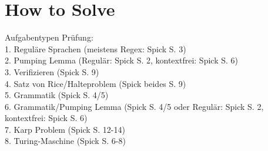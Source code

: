 \section{How to Solve}
Aufgabentypen Prüfung:\\
1. Reguläre Sprachen (meistens Regex: Spick S. 3)\\
2. Pumping Lemma (Regulär: Spick S. 2, kontextfrei: Spick S. 6)\\
3. Verifizieren (Spick S. 9)\\
4. Satz von Rice/Halteproblem (Spick beides S. 9)\\
5. Grammatik (Spick S. 4/5)\\
6. Grammatik/Pumping Lemma (Spick S. 4/5 oder Regulär: Spick S. 2, kontextfrei: Spick S. 6)\\
7. Karp Problem (Spick S. 12-14)\\
8. Turing-Maschine (Spick S. 6-8)\\